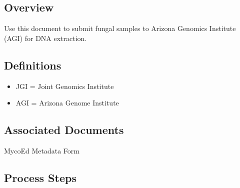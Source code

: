 \documentclass[
  letterpaper,
  DIV=11,
  numbers=noendperiod]{scrreprt}
\providecommand{\tightlist}{%
  \setlength{\itemsep}{0pt}\setlength{\parskip}{0pt}}
\begin{document}

\subsection*{Overview}\label{overview-2}

Use this document to submit fungal samples to Arizona Genomics Institute
(AGI) for DNA extraction.

\subsection*{Definitions}\label{definitions}

\begin{itemize}
\tightlist
\item
  JGI = Joint Genomics Institute
\item
  AGI = Arizona Genome Institute
\end{itemize}

\subsection*{Associated Documents}\label{associated-documents}

MycoEd Metadata Form

\subsection*{Process Steps}\label{process-steps}
\end{document}
